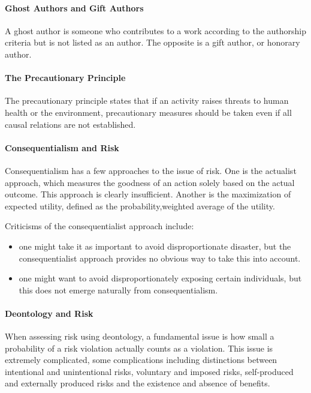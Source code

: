 \paragraph{Ghost Authors and Gift Authors}
A ghost author is someone who contributes to a work according to the authorship criteria but is not listed as an author. The opposite is a gift author, or honorary author.

\paragraph{The Precautionary Principle}
The precautionary principle states that if an activity raises threats to human health or the environment, precautionary measures should be taken even if all causal relations are not established.

\paragraph{Consequentialism and Risk}
Consequentialism has a few approaches to the issue of risk. One is the actualist approach, which measures the goodness of an action solely based on the actual outcome. This approach is clearly insufficient. Another is the maximization of expected utility, defined as the probability,weighted average of the utility.

Criticisms of the consequentialist approach include:
\begin{itemize}
	\item one might take it as important to avoid disproportionate disaster, but the consequentialist approach provides no obvious way to take this into account.
	\item one might want to avoid disproportionately exposing certain individuals, but this does not emerge naturally from consequentialism.
\end{itemize}

\paragraph{Deontology and Risk}
When assessing risk using deontology, a fundamental issue is how small a probability of a risk violation actually counts as a violation. This issue is extremely complicated, some complications including distinctions between intentional and unintentional risks, voluntary and imposed risks, self-produced and externally produced risks and the existence and absence of benefits.